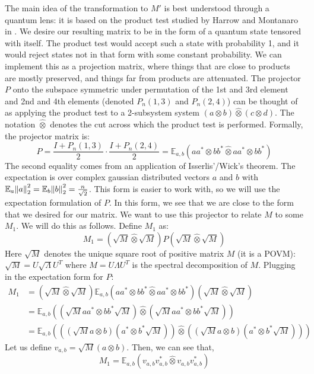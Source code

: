 \documentclass[10pt]{article}
\newcommand{\E}{\mathbb{E}}
\begin{document}
The main idea of the transformation to $M'$ is best understood through a quantum lens: it is based on the product test studied by Harrow and Montanaro in \cite{hm10}. We desire our resulting matrix to be in the form of a quantum state tensored with itself. The product test would accept such a state with probability 1, and it would reject states not in that form with some constant probability. We can implement this as a projection matrix, where things that are close to products are mostly preserved, and things far from products are attenuated. The projector $P$ onto the subspace symmetric under permutation of the 1st and 3rd element and 2nd and 4th elements (denoted $P_n(1,3)$ and $P_n(2,4)$) can be thought of as applying the product test to a 2-subsystem system $(a \otimes b) \hat{\otimes} (c \otimes d)$. The notation $\hat{\otimes}$ denotes the cut across which the product test is performed. Formally, the projector matrix is: 
$$P = \frac{I + P_n(1,3)}{2}\cdot \frac{I+P_n(2,4)}{2} = \mathbb{E}_{a,b}(aa^* \otimes bb^* \hat{\otimes} aa^* \otimes bb^*)$$
The second equality comes from an application of Isserlis'/Wick's theorem. The expectation is over complex gaussian distributed vectors $a$ and $b$ with $\E_a \norm{a}_2^2 = \E_b \norm{b}_2^2 = \frac{n}{\sqrt{2}}$. This form is easier to work with, so we will use the expectation formulation of $P$. In this form, we see that we are close to the form that we desired for our matrix. We want to use this projector to relate $M$ to some $M_1$. We will do this as follows. Define $M_1$ as:
$$M_1 = (\sqrt{M} \hat{\otimes} \sqrt{M})P(\sqrt{M} \hat{\otimes} \sqrt{M})$$
Here $\sqrt{M}$ denotes the unique square root of positive matrix $M$ (it is a POVM): $\sqrt{M} = U\sqrt{\Lambda}U^T$ where $M = U\Lambda U^T$ is the spectral decomposition of $M$. Plugging in the expectation form for $P$:
\begin{align}
    M_1 &= (\sqrt{M} \hat{\otimes} \sqrt{M})\mathbb{E}_{a,b}(aa^* \otimes bb^* \hat{\otimes} aa^* \otimes bb^*)(\sqrt{M} \hat{\otimes} \sqrt{M}) \nonumber\\
    &= \mathbb{E}_{a,b}((\sqrt{M} aa^* \otimes bb^* \sqrt{M})\hat{\otimes}(\sqrt{M} aa^* \otimes bb^* \sqrt{M})) \nonumber \\
    & = \mathbb{E}_{a,b}(((\sqrt{M} a\otimes b)(a^* \otimes b^* \sqrt{M}))\hat{\otimes}((\sqrt{M} a\otimes b)(a^* \otimes b^* \sqrt{M}))) \nonumber
\end{align}
Let us define $v_{a,b} = \sqrt{M} (a\otimes b)$. Then, we can see that,
$$M_1 = \mathbb{E}_{a,b}(v_{a,b} v_{a,b}^* \hat{\otimes} v_{a,b} v_{a,b}^*)$$
\end{document}
